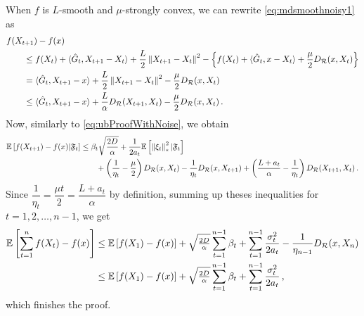 When $f$ is $L$-smooth and $\mu$-strongly convex,  we can rewrite \eqref{eq:mdsmoothnoisy1} as
\begin{align*}
\MoveEqLeft
f(X_{t+1}) - f(x) \nonumber\\
 &\le f(X_t) + \ip{ \hat{G}_t, X_{t+1}-X_t } + \frac{L}{2} \norm{X_{t+1}-X_t}^2 - \left\{ f(X_t) + \ip{ \hat{G}_t, x-X_t}+\dfrac{\mu}{2}\DR(x, X_t) \right\} \nonumber \\
 &= \ip{\hat{G}_t, X_{t+1} - x } +  \frac{L}{2} \norm{X_{t+1}-X_t}^2-\dfrac{\mu}{2}\DR(x, X_t) \nonumber\\
 &\le \ip{\hat{G}_t,X_{t+1}-x} + \frac{L}{\alpha} D_{\mathcal{R}}(X_{t+1},X_t)-\dfrac{\mu}{2}\DR(x, X_t)\,.
\end{align*}
Now, similarly to \eqref{eq:ubProofWithNoise}, we  obtain
\begin{align*}
\mathbb{E}\left[f(X_{t+1}) - f(x) |\mathfrak{F}_{t} \right]
& \le
 \beta_t \sqrt{ \frac{2D}{\alpha} }+
\frac{1}{2a_t}  \mathbb{E}\left[\left\|\xi_t\right\|_*^2|\mathfrak{F}_{t}\right]\\
&\qquad +\left(\dfrac{1}{\eta_t}-\dfrac{\mu}{2}  \right)D_{\mathcal{R}}(x,X_t)-\dfrac{1}{\eta_t}D_{\mathcal{R}}(x,X_{t+1})
+\left( \dfrac{L+a_t}{\alpha}-\dfrac{1}{\eta_t} \right)D_{\mathcal{R}}(X_{t+1},X_t) \,.
\end{align*}
Since $\dfrac{1}{\eta_t}=\dfrac{\mu t}{2}=\dfrac{L+a_t}{\alpha}$ by definition, summing up theses inequalities for $t=1,2,\ldots,n-1$, we get
\begin{align*}
 \mathbb{E}\left[ \sum_{t=1}^n f(X_t) - f(x) \right]
& \le
  \mathbb{E}\left[f(X_1)-f(x)\right] + \sqrt{\tfrac{2D}{\alpha}} \sum_{t=1}^{n-1} \beta_t +
	  \sum_{t=1}^{n-1}\frac{\sigma_t^2}{2a_t}-\dfrac{1}{\eta_{n-1}}D_{\mathcal{R}}(x,X_{n})\\
& \le
  \mathbb{E}\left[f(X_1)-f(x)\right] + \sqrt{\tfrac{2D}{\alpha}} \sum_{t=1}^{n-1} \beta_t +
	  \sum_{t=1}^{n-1}\frac{\sigma_t^2}{2a_t}\,,
\end{align*}
which finishes the proof.



